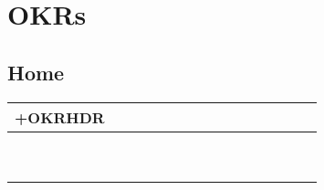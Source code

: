 \pagebreak

\section*{OKRs}
\subsection*{Home}
\begin{tabularx}{\textwidth}{|p{1.5in}|p{1.5in}||X|X|X|X|X|X|X|X|X|X|X|X|X|}
    \hline
    +OKRHDR \\ \hline\hline
    &            &    &    &    &    &    &    &    &    &    &    &    &    &    \\ \cline{2-15}
    &            &    &    &    &    &    &    &    &    &    &    &    &    &    \\ \cline{2-15}
    &            &    &    &    &    &    &    &    &    &    &    &    &    &    \\ \hline
    &            &    &    &    &    &    &    &    &    &    &    &    &    &    \\ \cline{2-15}
    &            &    &    &    &    &    &    &    &    &    &    &    &    &    \\ \cline{2-15}
    &            &    &    &    &    &    &    &    &    &    &    &    &    &    \\ \hline
    &            &    &    &    &    &    &    &    &    &    &    &    &    &    \\ \cline{2-15}
    &            &    &    &    &    &    &    &    &    &    &    &    &    &    \\ \cline{2-15}
    &            &    &    &    &    &    &    &    &    &    &    &    &    &    \\ \hline
\end{tabularx}

